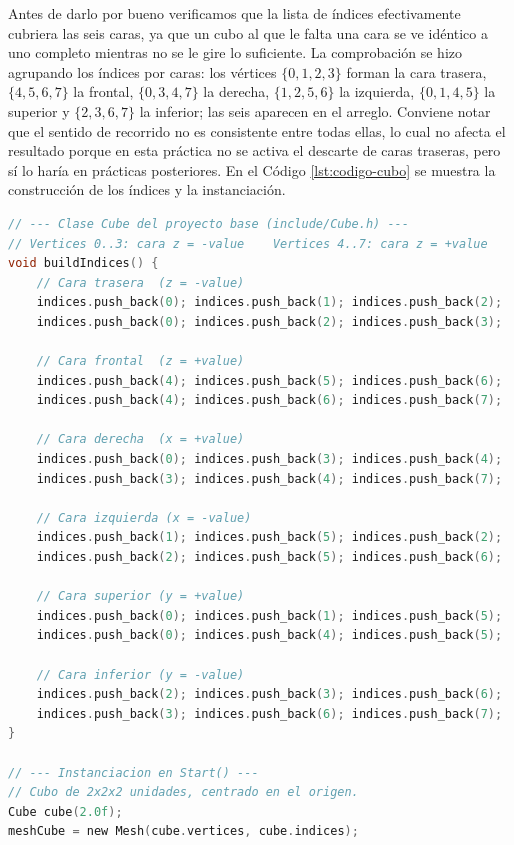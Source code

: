 Antes de darlo por bueno verificamos que la lista de índices efectivamente
cubriera las seis caras, ya que un cubo al que le falta una cara se ve idéntico
a uno completo mientras no se le gire lo suficiente. La comprobación se hizo
agrupando los índices por caras: los vértices $\{0,1,2,3\}$ forman la cara
trasera, $\{4,5,6,7\}$ la frontal, $\{0,3,4,7\}$ la derecha, $\{1,2,5,6\}$ la
izquierda, $\{0,1,4,5\}$ la superior y $\{2,3,6,7\}$ la inferior; las seis
aparecen en el arreglo. Conviene notar que el sentido de recorrido no es
consistente entre todas ellas, lo cual no afecta el resultado porque en esta
práctica no se activa el descarte de caras traseras, pero sí lo haría en
prácticas posteriores. En el Código \ref{lst:codigo-cubo} se muestra la
construcción de los índices y la instanciación.

\begin{lstlisting}[language=C, caption={Indices por cara del cubo e instanciacion con arista 2}, label=lst:codigo-cubo]
// --- Clase Cube del proyecto base (include/Cube.h) ---
// Vertices 0..3: cara z = -value    Vertices 4..7: cara z = +value
void buildIndices() {
    // Cara trasera  (z = -value)
    indices.push_back(0); indices.push_back(1); indices.push_back(2);
    indices.push_back(0); indices.push_back(2); indices.push_back(3);

    // Cara frontal  (z = +value)
    indices.push_back(4); indices.push_back(5); indices.push_back(6);
    indices.push_back(4); indices.push_back(6); indices.push_back(7);

    // Cara derecha  (x = +value)
    indices.push_back(0); indices.push_back(3); indices.push_back(4);
    indices.push_back(3); indices.push_back(4); indices.push_back(7);

    // Cara izquierda (x = -value)
    indices.push_back(1); indices.push_back(5); indices.push_back(2);
    indices.push_back(2); indices.push_back(5); indices.push_back(6);

    // Cara superior (y = +value)
    indices.push_back(0); indices.push_back(1); indices.push_back(5);
    indices.push_back(0); indices.push_back(4); indices.push_back(5);

    // Cara inferior (y = -value)
    indices.push_back(2); indices.push_back(3); indices.push_back(6);
    indices.push_back(3); indices.push_back(6); indices.push_back(7);
}

// --- Instanciacion en Start() ---
// Cubo de 2x2x2 unidades, centrado en el origen.
Cube cube(2.0f);
meshCube = new Mesh(cube.vertices, cube.indices);
\end{lstlisting}

